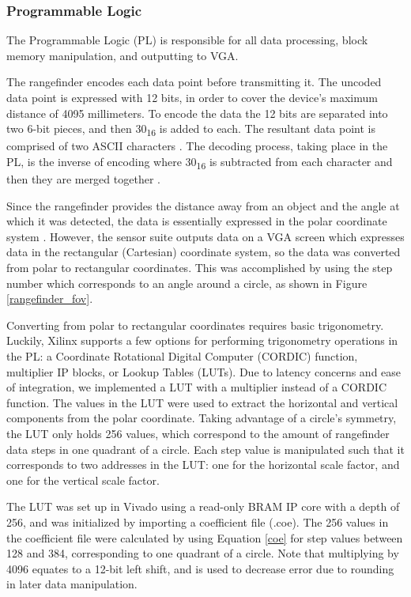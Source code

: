 \subsubsection{Programmable Logic}
The Programmable Logic (PL) is responsible for all data processing, block memory manipulation, and outputting to VGA.
\par
The rangefinder encodes each data point before transmitting it. The uncoded data point is expressed with 12 bits, in order to cover the device's maximum distance of 4095 millimeters. To encode the data the 12 bits are separated into two 6-bit pieces, and then 30\textsubscript{16} is added to each. The resultant data point is comprised of two ASCII characters \cite{ascii}. The decoding process, taking place in the PL, is the inverse of encoding where 30\textsubscript{16} is subtracted from each character and then they are merged together \cite{urg04lx_datasheet}.
\par
Since the rangefinder provides the distance away from an object and the angle at which it was detected, the data is essentially expressed in the polar coordinate system \cite{polar_coordinates}. However, the sensor suite outputs data on a VGA screen which expresses data in the rectangular (Cartesian) coordinate system, so the data was converted from polar to rectangular coordinates. This was accomplished by using the step number which corresponds to an angle around a circle, as shown in Figure \ref{rangefinder_fov}.
\par
Converting from polar to rectangular coordinates requires basic trigonometry. Luckily, Xilinx supports a few options for performing trigonometry operations in the PL: a Coordinate Rotational Digital Computer (CORDIC) function, multiplier IP blocks, or Lookup Tables (LUTs). Due to latency concerns and ease of integration, we implemented a LUT with a multiplier instead of a CORDIC function. The values in the LUT were used to extract the horizontal and vertical components from the polar coordinate. Taking advantage of a circle's symmetry, the LUT only holds 256 values, which correspond to the amount of rangefinder data steps in one quadrant of a circle. Each step value is manipulated such that it corresponds to two addresses in the LUT: one for the horizontal scale factor, and one for the vertical scale factor.
\par
The LUT was set up in Vivado using a read-only BRAM IP core with a depth of 256, and was initialized by importing a coefficient file (.coe). The 256 values in the coefficient file were calculated by using Equation \ref{coe} for step values between 128 and 384, corresponding to one quadrant of a circle. Note that multiplying by 4096 equates to a 12-bit left shift, and is used to decrease error due to rounding in later data manipulation.

